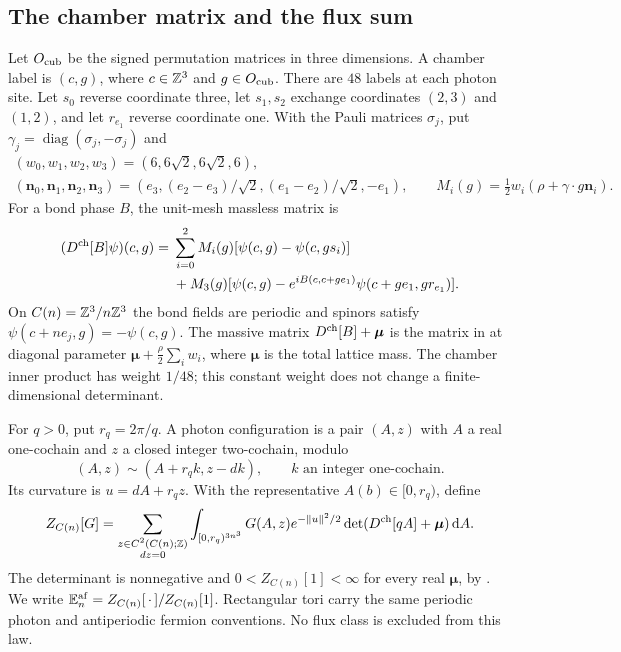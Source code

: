 \subsection{The chamber matrix and the flux sum}
Let $O_{\rm cub}$ be the signed permutation matrices in three dimensions.
A chamber label is $(c,g)$, where $c\in\mathbb Z^3$ and $g\in O_{\rm cub}$.
There are $48$ labels at each photon site. Let $s_0$ reverse coordinate
three, let $s_1,s_2$ exchange coordinates $(2,3)$ and $(1,2)$, and let
$r_{e_1}$ reverse coordinate one. With the Pauli matrices $\sigma_j$, put
$\gamma_j=\operatorname{diag}(\sigma_j,-\sigma_j)$ and
\[
 \begin{gathered}
 (w_0,w_1,w_2,w_3)=(6,6\sqrt2,6\sqrt2,6),\\
 (\mathbf n_0,\mathbf n_1,\mathbf n_2,\mathbf n_3)
 =(e_3,(e_2-e_3)/\sqrt2,(e_1-e_2)/\sqrt2,-e_1),\qquad
 M_i(g)=\tfrac12w_i(\rho+\gamma\cdot g\mathbf n_i).
 \end{gathered}
\]
For a bond phase $B$, the unit-mesh massless matrix is
\begin{equation}\label{eq:reg-dirac}
 \begin{split}
 (D^{\rm ch}[B]\psi)(c,g)={}&
 \sum_{i=0}^2M_i(g)[\psi(c,g)-\psi(c,gs_i)]\\
 &+M_3(g)[\psi(c,g)-e^{iB(c,c+ge_1)}
                         \psi(c+ge_1,gr_{e_1})].
 \end{split}
\end{equation}
On $C(n)=\mathbb Z^3/n\mathbb Z^3$ the bond fields are periodic and spinors
satisfy $\psi(c+ne_j,g)=-\psi(c,g)$. The massive matrix
$D^{\rm ch}[B]+\boldsymbol\mu$ is the matrix in
\cite[Section~2]{ChamberLattice} at diagonal parameter
$\boldsymbol\mu+\frac\rho2\sum_iw_i$, where $\boldsymbol\mu$ is
the total lattice mass. The chamber inner product has weight $1/48$;
this constant weight does not change a finite-dimensional determinant.

For $q>0$, put $r_q=2\pi/q$. A photon configuration is a pair
$(A,z)$ with $A$ a real one-cochain and $z$ a closed integer
two-cochain, modulo
\[
 (A,z)\sim(A+r_q k,z-dk),\qquad k\text{ an integer one-cochain}.
\]
Its curvature is $u=dA+r_qz$. With the representative
$A(b)\in[0,r_q)$, define
\begin{equation}\label{eq:reg-functional}
 Z_{C(n)}[G]=
 \sum_{\substack{z\in C^2(C(n);\mathbb Z)\\dz=0}}
 \int_{[0,r_q)^{3n^3}}
 G(A,z)e^{-\|u\|^2/2}
 \det(D^{\rm ch}[qA]+\boldsymbol\mu)\,\mathrm d A.
\end{equation}
The determinant is nonnegative and $0<Z_{C(n)}[1]<\infty$ for
every real $\boldsymbol\mu$, by
\cite[Propositions~2.2--2.3]{ChamberLattice}.
We write $\mathbb E_n^{\rm af}=Z_{C(n)}[\,\cdot\,]/Z_{C(n)}[1]$.
Rectangular tori carry the same periodic photon and antiperiodic
fermion conventions. No flux class is excluded from this law.

